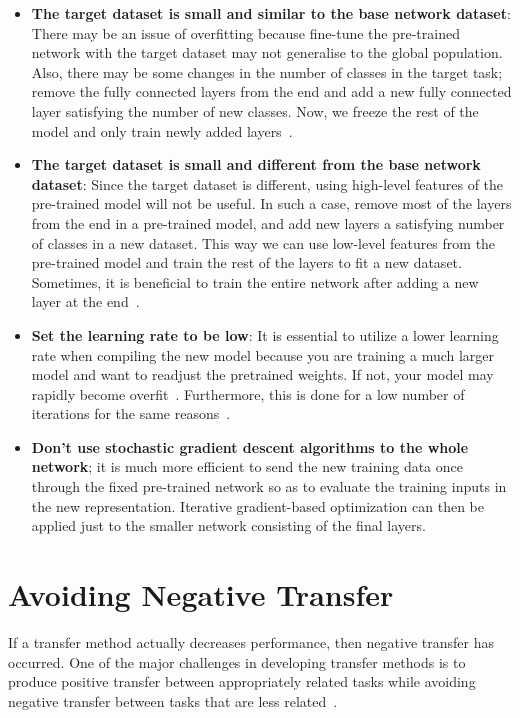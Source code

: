 \documentclass[11pt]{article}
\begin{document}
\begin{itemize}
    \item \textbf{The target dataset is small and similar to the base network dataset}: There may be an issue of overfitting because fine-tune the pre-trained network with the target dataset may not generalise to the global population. Also, there may be some changes in the number of classes in the target task; remove the fully connected layers from the end and add a new fully connected layer satisfying the number of new classes. Now, we freeze the rest of the model and only train newly added layers~\cite{geeks-transfer-learning}.
    \item \textbf{The target dataset is small and different from the base network dataset}: Since the target dataset is different, using high-level features of the pre-trained model will not be useful. In such a case, remove most of the layers from the end in a pre-trained model, and add new layers a satisfying number of classes in a new dataset. This way we can use low-level features from the pre-trained model and train the rest of the layers to fit a new dataset. Sometimes, it is beneficial to train the entire network after adding a new layer at the end~\cite{geeks-transfer-learning}.
    \item \textbf{Set the learning rate to be low}: It is essential to utilize a lower learning rate when compiling the new model because you are training a much larger model and want to readjust the pretrained weights. If not, your model may rapidly become overfit~\cite{geeks-transfer-learning}. Furthermore, this is done for a low number of iterations for the same reasons~\cite{deep-learning-book}.
    \item \textbf{Don't use stochastic gradient descent algorithms to the whole network}; it is much more efficient to send the new training data once through the fixed pre-trained network so as to evaluate the training inputs in the new representation. Iterative gradient-based optimization can then be applied just to the smaller network consisting of the final     layers.
\end{itemize}

\section{Avoiding Negative Transfer} \label{sec:negative-transfer}

If a transfer method actually decreases performance, then negative transfer has occurred. One of the major challenges in developing transfer methods is to produce positive transfer between appropriately related tasks while avoiding negative transfer between tasks that are less related~\cite{torrey-handbook}.
\end{document}
